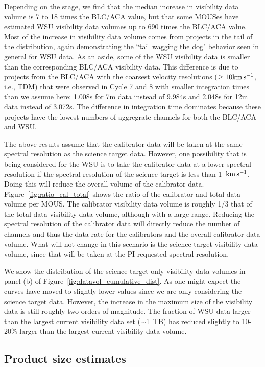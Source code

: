 \documentclass[preprint]{aastex631}
\newcommand{\kms}{\ensuremath{\rm{ km \, s^{-1}}}}
\begin{document}
Depending on the stage, we find that the median increase in visibility data volume is 7 to 18 times the BLC/ACA value, but that some MOUSes have estimated WSU visibility data volumes up to 690 times the BLC/ACA value.   Most of the increase in visibility data volume comes from projects in the tail of the distribution, again demonstrating the ``tail wagging the dog" behavior seen in general for WSU data.  As an aside, some of the WSU visibility data is smaller than the corresponding BLC/ACA visibility data. This difference is due to projects from the BLC/ACA with the coarsest velocity resolutions ($\geq 10\kms$, i.e., TDM) that were observed in Cycle 7 and 8 with smaller integration times than we assume here: 1.008s for 7m data instead of 9.984s and 2.048s for 12m data instead of 3.072s. The difference in integration time dominates because these projects have the lowest numbers of aggregrate channels for both the BLC/ACA and WSU.

The above results assume that the calibrator data will be taken at the same spectral resolution as the science target data. However, one possibility that is being considered for the WSU is to take the calibrator data at a lower spectral resolution if the spectral resolution of the science target is less than 1~\kms. Doing this will reduce the overall volume of the calibrator data. Figure~\ref{fig:ratio_cal_total} shows the ratio of the calibrator and total data volume per MOUS. The calibrator visibility data volume is roughly 1/3 that of the total data visibility data volume, although with a large range. Reducing the spectral resolution of the calibrator data will directly reduce the number of channels and thus the data rate for the calibrators and the overall calibrator data volume. What will not change in this scenario is the science target visibility data volume, since that will be taken at the PI-requested spectral resolution. 

We show the distribution of the science target only visibility data volumes in panel (b) of Figure~\ref{fig:datavol_cumulative_dist}. As one might expect the curves have moved to slightly lower values since we are only considering the science target data. However, the increase in the maximum size of the visibility data is still roughly two orders of magnitude. The  fraction of WSU data larger than the largest current visibility data set ($\sim$1~TB) has reduced slightly to 10-20\% larger than the largest current visibility data volume.



\subsection{Product size estimates} \label{sec:results_productsize}
\end{document}
